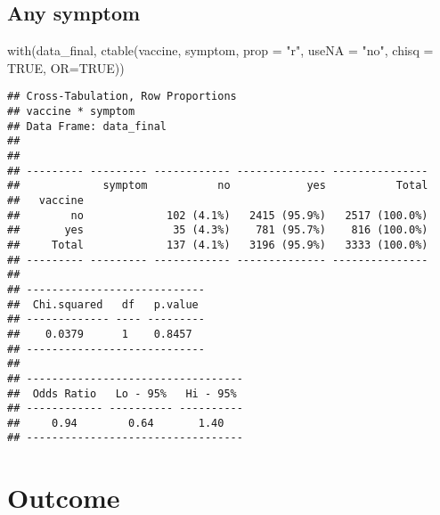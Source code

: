 \documentclass[
]{article}
\newenvironment{Shaded}{\begin{snugshade}}{\end{snugshade}}
\newcommand{\AttributeTok}[1]{\textcolor[rgb]{0.77,0.63,0.00}{#1}}
\newcommand{\ConstantTok}[1]{\textcolor[rgb]{0.00,0.00,0.00}{#1}}
\newcommand{\FunctionTok}[1]{\textcolor[rgb]{0.00,0.00,0.00}{#1}}
\newcommand{\NormalTok}[1]{#1}
\newcommand{\StringTok}[1]{\textcolor[rgb]{0.31,0.60,0.02}{#1}}
\begin{document}
\hypertarget{any-symptom}{%
\subsection{Any symptom}\label{any-symptom}}

\begin{Shaded}
\begin{Highlighting}[]
\FunctionTok{with}\NormalTok{(data\_final, }\FunctionTok{ctable}\NormalTok{(vaccine, symptom, }\AttributeTok{prop =} \StringTok{"r"}\NormalTok{, }\AttributeTok{useNA =} \StringTok{"no"}\NormalTok{, }\AttributeTok{chisq =} \ConstantTok{TRUE}\NormalTok{, }\AttributeTok{OR=}\ConstantTok{TRUE}\NormalTok{))}
\end{Highlighting}
\end{Shaded}

\begin{verbatim}
## Cross-Tabulation, Row Proportions  
## vaccine * symptom  
## Data Frame: data_final  
## 
## 
## --------- --------- ------------ -------------- ---------------
##             symptom           no            yes           Total
##   vaccine                                                      
##        no             102 (4.1%)   2415 (95.9%)   2517 (100.0%)
##       yes              35 (4.3%)    781 (95.7%)    816 (100.0%)
##     Total             137 (4.1%)   3196 (95.9%)   3333 (100.0%)
## --------- --------- ------------ -------------- ---------------
## 
## ----------------------------
##  Chi.squared   df   p.value 
## ------------- ---- ---------
##    0.0379      1    0.8457  
## ----------------------------
## 
## ----------------------------------
##  Odds Ratio   Lo - 95%   Hi - 95% 
## ------------ ---------- ----------
##     0.94        0.64       1.40   
## ----------------------------------
\end{verbatim}

\hypertarget{outcome}{%
\section{Outcome}\label{outcome}}
\end{document}

